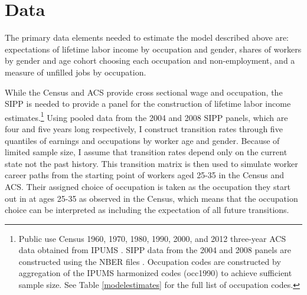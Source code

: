 \documentclass[12pt]{article}
\begin{document}

\section{Data} \label{data}
The primary data elements needed to estimate the model described above are: expectations of lifetime labor income by occupation and gender, shares of workers by gender and age cohort choosing each occupation and non-employment, and a measure of unfilled jobs by occupation.

While the Census and ACS provide cross sectional wage and occupation, the SIPP is needed to provide a panel for the construction of lifetime labor income estimates.\footnote{Public use Census 1960, 1970, 1980, 1990, 2000, and 2012 three-year ACS data obtained from IPUMS \cite{IPUMSUSA}. SIPP data from the 2004 and 2008 panels are constructed using the NBER files \cite{SIPP}. Occupation codes are constructed by aggregation of the IPUMS harmonized codes (occ1990) to achieve sufficient sample size. See Table \ref{modelestimates} for the full list of occupation codes.} Using pooled data from the 2004 and 2008 SIPP panels, which are four and five years long respectively, I construct transition rates through five quantiles of earnings and occupations by worker age and gender. Because of limited sample size, I assume that transition rates depend only on the current state not the past history. This transition matrix is then used to simulate worker career paths from the starting point of workers aged 25-35 in the Census and ACS. Their assigned choice of occupation is taken as the occupation they start out in at ages 25-35 as observed in the Census, which means that the occupation choice can be interpreted as including the expectation of all future transitions.




\end{document}
